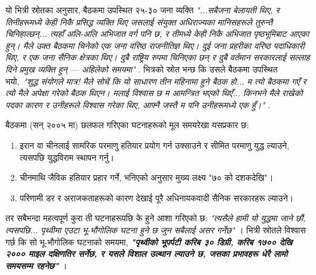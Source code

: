 \documentclass[10pt,twocolumn,letterpaper]{article}
\begin{document}
यो भित्री स्रोतका अनुसार, बैठकमा उपस्थित २५-३० जना व्यक्ति \textit{"...सबैजना बेलायती थिए, र तिनीहरूमध्ये केही निकै प्रसिद्ध व्यक्ति थिए जसलाई संयुक्त अधिराज्यका मानिसहरूले तुरुन्तै चिनिहाल्छन्... त्यहाँ अलि-अलि अभिजात वर्ग पनि छ, र तीमध्ये केही निकै अभिजात पृष्ठभूमिबाट आएका हुन्। मैले उक्त बैठकमा चिनेको एक जना वरिष्ठ राजनीतिज्ञ थिए। दुई जना प्रहरीका वरिष्ठ पदाधिकारी थिए, र एक जना सैनिक क्षेत्रका थिए। दुबै राष्ट्रिय रुपमा चिनिएका छन् र दुबै वर्तमान सरकारलाई सल्लाह दिने प्रमुख व्यक्ति हुन् — अहिलेको समयमा"} \cite{4}. भित्रको स्रोत भन्छ कि उसले बैठकमा उपस्थित भयो,\ \textit{"शुद्ध संयोगले मात्र! मैले सोचें कि यो साधारण तीन महिनामा हुने बैठक हो... म त्यो बैठकमा गएँ र त्यो मैले अपेक्षा गरेको बैठक थिएन। मलाई विश्वास छ म आमन्त्रित भएको थिएँ... किनभने मैले राखेको पदका कारण र उनीहरूले विश्वास गरेका थिए, आफ्नै जस्तै म पनि उनीहरूमध्ये एक हुँ।"} \cite{4}.

बैठकमा (सन् २००५ मा) छलफल गरिएका घटनाहरूको मूल समयरेखा यसप्रकार छ:

\begin{flushleft}
\begin{enumerate}
    \item इरान वा चीनलाई सामरिक परमाणु हतियार प्रयोग गर्न उक्साउने र सीमित परमाणु युद्ध ल्याउने, त्यसपछि युद्धविराम स्थापन गर्नु।
    \item चीनमाथि जैविक हतियार प्रहार गर्ने, भनिएको अनुसार मुख्य लक्ष्य "७० को दशकदेखि"।
    \item परिणामी डर र अराजकताहरूको कारण देखाई पूरै अधिनायकवादी सैनिक सरकारहरू ल्याउने।
\end{enumerate}
\end{flushleft}

तर सबैभन्दा महत्वपूर्ण कुरा ती घटनाहरूपछि के हुने आशा गरिएको छ: \textit{"त्यसैले हामी यो युद्धमा जाने छौं, त्यसपछि... पृथ्वीमा एउटा भू-भौगोलिक घटना हुने छ जुन सबैलाई असर गर्नेछ"} \cite{4}। भित्री स्रोतले विश्वास गर्छ कि सो भू-भौगोलिक घटनाको समयमा, \textit{\textbf{"पृथ्वीको भूपर्पटी करिब ३० डिग्री, करिब १७०० देखि २००० माइल दक्षिणतिर सर्नेछ, र यसले विशाल उल्थान ल्याउने छ, जसका प्रभावहरू धेरै लामो समयसम्म रहनेछ"}} \cite{4}।
\end{document}
